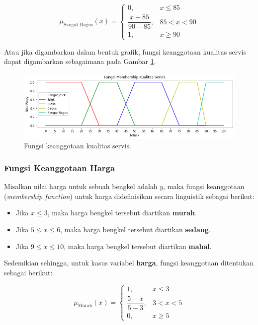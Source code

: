 \documentclass[12pt,a4paper]{article}
\theoremstyle{remark}
\begin{document}
\[
\mu_{\text{Sangat Bagus}}(x) =
\begin{cases}
0, & x \leq 85 \\
\dfrac{x - 85}{90 - 85}, & 85 < x < 90 \\
1, & x \geq 90
\end{cases}
\]

Atau jika digambarkan dalam bentuk grafik, fungsi keanggotaan kualitas servis dapat digambarkan sebagaimana pada Gambar \ref{fig:member_servis}.
\begin{figure}[H]
    \centering
    \includegraphics[width=1\linewidth]{images/member_servis.png}
    \caption{Fungsi keanggotaan kualitas servis.}
    \label{fig:member_servis}
\end{figure}


\subsubsection*{Fungsi Keanggotaan Harga}
Misalkan nilai harga untuk sebuah bengkel adalah $y$,
maka fungsi keanggotaan (\textit{membership function}) untuk harga didefinisikan secara linguistik sebagai berikut:

\begin{itemize}
    \item Jika $x \leq 3$, maka harga bengkel tersebut diartikan \textbf{murah}.
    \item Jika $5 \leq x \leq 6$, maka harga bengkel tersebut diartikan \textbf{sedang}.
    \item Jika $9 \leq x \leq 10$, maka harga bengkel tersebut diartikan \textbf{mahal}.
\end{itemize}


Sedemikian sehingga, untuk kasus variabel \textbf{harga}, fungsi keanggotaan ditentukan sebagai berikut:

\[
    \mu_{\text{Murah}}(x) =
    \begin{cases}
        1,                    & x \leq 3  \\
        \dfrac{5 - x}{5 - 3}, & 3 < x < 5 \\
        0,                    & x \geq 5
    \end{cases}
\]
\end{document}
